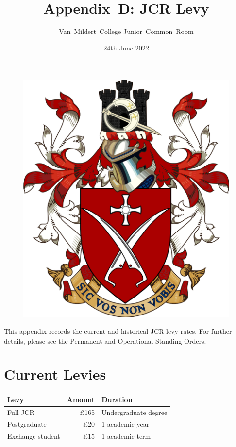 \documentclass[12pt]{article}
\title{Appendix~D: JCR Levy}
\author{Van~Mildert~College Junior~Common~Room}
\date{24th June 2022}
\begin{document}
\begin{titlepage}  %
    \maketitle
    \begin{figure}[h]
        \includegraphics[scale=0.25]{arms}  %
        \centering
    \end{figure}
    \thispagestyle{empty}
\end{titlepage}
\setcounter{page}{2}  %
This appendix records the current and historical JCR levy rates.
For further details, please see the Permanent and Operational Standing Orders.

\section{Current Levies}
\begin{center}
\begin{tabular}{|l|r|l|}\hline
    \textbf{Levy} & \textbf{Amount} & \textbf{Duration} \\\hline
    Full JCR & £165 & Undergraduate degree \\
    Postgraduate &  £20 & 1 academic year \\
    Exchange student & £15 & 1 academic term\\
    \hline
\end{tabular}
\end{center}
\end{document}
